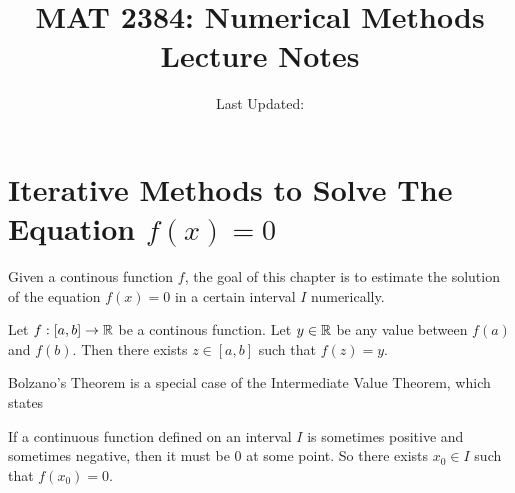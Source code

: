 \documentclass[openany]{report}
\title{MAT 2384: Numerical Methods Lecture Notes}
\author{Last Updated:}
\begin{document}
\maketitle

\tableofcontents

\chapter{Iterative Methods to Solve The Equation $f(x) = 0$}
Given a continous function $f$, the goal of this chapter is to estimate the solution of the equation $f(x) = 0$ in a certain interval $I$ numerically. 
\begin{theorem}
    Let $f: [a,b] \rightarrow \mathbb{R}$ be a continous function. Let $y \in \mathbb{R}$ be any value between $f(a)$ and $f(b)$. Then there exists $z \in [a,b]$ such that $f(z) = y$.
\end{theorem}
Bolzano's Theorem is a special case of the Intermediate Value Theorem, which states
\begin{theorem}
    If a continuous function defined on an interval $I$ is sometimes positive and sometimes negative, then it must be 0 at some point. So there exists $x_0 \in I$ such that $f(x_0) = 0$.
\end{theorem}
\end{document}
